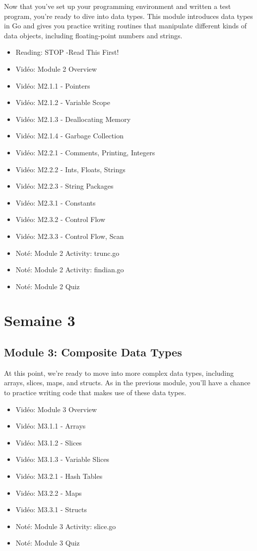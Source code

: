 Now that you’ve set up your programming environment and written a test program, you’re ready to dive into data types. This module introduces data types in Go and gives you practice writing routines that manipulate different kinds of data objects, including floating-point numbers and strings.
\begin{multicols}{2}
\begin{itemize}[label={$\bullet$}]
  \item Reading: STOP -Read This First!
  \item Vidéo: Module 2 Overview
  \item Vidéo: M2.1.1 - Pointers
  \item Vidéo: M2.1.2 - Variable Scope
  \item Vidéo: M2.1.3 - Deallocating Memory
  \item Vidéo: M2.1.4 - Garbage Collection 
  \item Vidéo: M2.2.1 - Comments, Printing, Integers
  \item Vidéo: M2.2.2 - Ints, Floats, Strings
  \item Vidéo: M2.2.3 - String Packages
  \item Vidéo: M2.3.1 - Constants
  \item Vidéo: M2.3.2 - Control Flow
  \item Vidéo: M2.3.3 - Control Flow, Scan
  \item Noté: Module 2 Activity: trunc.go
  \item Noté: Module 2 Activity: findian.go
  \item Noté: Module 2 Quiz
\end{itemize}
\end{multicols}
\section*{Semaine 3}

\subsection*{Module 3: Composite Data Types}

At this point, we’re ready to move into more complex data types, including arrays, slices, maps, and structs. As in the previous module, you’ll have a chance to practice writing code that makes use of these data types.
\begin{multicols}{2}
\begin{itemize}[label={$\bullet$}]
  \item Vidéo: Module 3 Overview
  \item Vidéo: M3.1.1 - Arrays
  \item Vidéo: M3.1.2 - Slices
  \item Vidéo: M3.1.3 - Variable Slices
  \item Vidéo: M3.2.1 - Hash Tables
  \item Vidéo: M3.2.2 - Maps
  \item Vidéo: M3.3.1 - Structs
  \item Noté: Module 3 Activity: slice.go
  \item Noté: Module 3 Quiz
\end{itemize}
\end{multicols}

